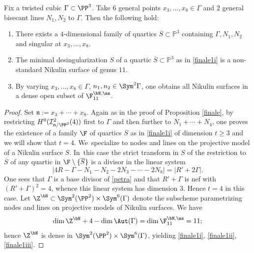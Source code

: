 \begin{prop}\label{finale1}
Fix a twisted cubic $\Gamma\subset \PP^3$. Take $6$ general points $x_3,\ldots,x_8\in \Gamma$ and $2$ general bisecant lines $N_1,N_2$ to $\Gamma$. Then the following hold:
\begin{enumerate}
\item\label{finale1i}
There exists a $4$-dimensional family of quartics $\overline{S}\subset\mathbb P^3$ containing $\Gamma,N_1,N_2$ and singular at $x_3,\ldots,x_8$.
\item\label{finale1ii}
The minimal desingularization $S$ of a quartic $\overline{S}\subset\mathbb P^3$ as in \eqref{finale1i} is a non-standard Nikulin surface of genus $11$.
\item\label{finale1iii}
By varying $x_3,\ldots,x_8\in \Gamma$, $n_1, n_2\in \Sym^2\Gamma$, one obtains all Nikulin surfaces in a dense open subset of $\F_{11}^{\bN,\ns}$.
\end{enumerate}
\end{prop}

\begin{proof}
Set $\mathfrak n:=x_3+\cdots+x_8$. Again as in the proof of Proposition \ref{finale}, by restricting $H^0(\mathcal I^2_{\mathfrak{n}/\PP^3}(4))$ first to $\Gamma$ and then further to $N_1+\cdots+N_4$, one proves the existence of a family $\F$ of quartics $\overline{S}$ as in \eqref{finale1i} of dimension $t\geq 3$ and we will show that $t=4$. We~specialize to nodes and lines on the projective model of a Nikulin surface $S$. In~this case the strict transform in $S$ of the restriction to $\overline S$ of any quartic in $\F\setminus\{\overline S\}$ is a divisor in the linear system\vspace*{-3pt}
\begin{equation}\label{petra}|4R-\Gamma-N_1-N_2-2N_3-\cdots-2N_8|=|R'+2\Gamma|.\end{equation} One sees that $\Gamma$ is a base divisor of \eqref{petra} and that $R'+\Gamma$ is nef with \hbox{$(R'+\Gamma)^2=4$}, whence this linear system has dimension $3$. Hence $t= 4$ in this case. Let $\Z^{\bN}\subset \Sym^2(\PP^2)\times \Sym^6(\Gamma)$ denote the subscheme parametrizing nodes and lines on projective models of Nikulin surfaces. We have\vspace*{-3pt}
\[
\dim \Z^{\bN}+4-\dim\Aut(\Gamma)=\dim\F_{11}^{\bN,\ns}=11;
\]
hence $\Z^{\bN}$ is dense in $\Sym^2(\PP^2)\times \Sym^6(\Gamma)$, yielding \eqref{finale1i}, \eqref{finale1ii}, \eqref{finale1iii}.
\end{proof}

